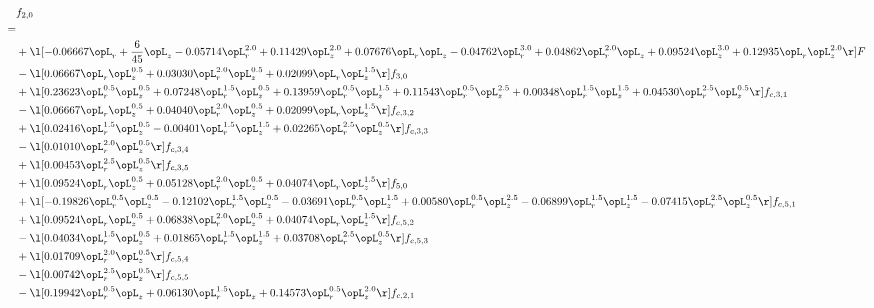 \begin{alignat}{2} 
\label{eq:f_20_2} 
& f_{2,0} \nonumber \\ 
 = \\ 
& + \l[  -0.06667 \opL_r + \frac{6}{45} \opL_z   -0.05714 \opL_r^{2.0} +  0.11429 \opL_z^{2.0} +  0.07676 \opL_r \opL_z   -0.04762 \opL_r^{3.0} +  0.04862 \opL_r^{2.0} \opL_z +  0.09524 \opL_z^{3.0} +  0.12935 \opL_r \opL_z^{2.0}  \r] F \nonumber \\ 
& - \l[  0.06667 \opL_r \opL_z^{0.5} +  0.03030 \opL_r^{2.0} \opL_z^{0.5} +  0.02099 \opL_r \opL_z^{1.5}  \r] f_{3,0} \nonumber \\ 
& + \l[  0.23623 \opL_r^{0.5} \opL_z^{0.5} +  0.07248 \opL_r^{1.5} \opL_z^{0.5} +  0.13959 \opL_r^{0.5} \opL_z^{1.5} +  0.11543 \opL_r^{0.5} \opL_z^{2.5} +  0.00348 \opL_r^{1.5} \opL_z^{1.5} +  0.04530 \opL_r^{2.5} \opL_z^{0.5}  \r] f_{c,3,1} \nonumber \\ 
& - \l[  0.06667 \opL_r \opL_z^{0.5} +  0.04040 \opL_r^{2.0} \opL_z^{0.5} +  0.02099 \opL_r \opL_z^{1.5}  \r] f_{c,3,2} \nonumber \\ 
& + \l[  0.02416 \opL_r^{1.5} \opL_z^{0.5}   -0.00401 \opL_r^{1.5} \opL_z^{1.5} +  0.02265 \opL_r^{2.5} \opL_z^{0.5}  \r] f_{c,3,3} \nonumber \\ 
& - \l[  0.01010 \opL_r^{2.0} \opL_z^{0.5}  \r] f_{c,3,4} \nonumber \\ 
& + \l[  0.00453 \opL_r^{2.5} \opL_z^{0.5}  \r] f_{c,3,5} \nonumber \\ 
& + \l[  0.09524 \opL_r \opL_z^{0.5} +  0.05128 \opL_r^{2.0} \opL_z^{0.5} +  0.04074 \opL_r \opL_z^{1.5}  \r] f_{5,0} \nonumber \\ 
& + \l[  -0.19826 \opL_r^{0.5} \opL_z^{0.5}   -0.12102 \opL_r^{1.5} \opL_z^{0.5}   -0.03691 \opL_r^{0.5} \opL_z^{1.5} +  0.00580 \opL_r^{0.5} \opL_z^{2.5}   -0.06899 \opL_r^{1.5} \opL_z^{1.5}   -0.07415 \opL_r^{2.5} \opL_z^{0.5}  \r] f_{c,5,1} \nonumber \\ 
& + \l[  0.09524 \opL_r \opL_z^{0.5} +  0.06838 \opL_r^{2.0} \opL_z^{0.5} +  0.04074 \opL_r \opL_z^{1.5}  \r] f_{c,5,2} \nonumber \\ 
& - \l[  0.04034 \opL_r^{1.5} \opL_z^{0.5} +  0.01865 \opL_r^{1.5} \opL_z^{1.5} +  0.03708 \opL_r^{2.5} \opL_z^{0.5}  \r] f_{c,5,3} \nonumber \\ 
& + \l[  0.01709 \opL_r^{2.0} \opL_z^{0.5}  \r] f_{c,5,4} \nonumber \\ 
& - \l[  0.00742 \opL_r^{2.5} \opL_z^{0.5}  \r] f_{c,5,5} \nonumber \\ 
& - \l[  0.19942 \opL_r^{0.5} \opL_z +  0.06130 \opL_r^{1.5} \opL_z +  0.14573 \opL_r^{0.5} \opL_z^{2.0}  \r] f_{c,2,1} \nonumber \\ 

\end{alignat}
